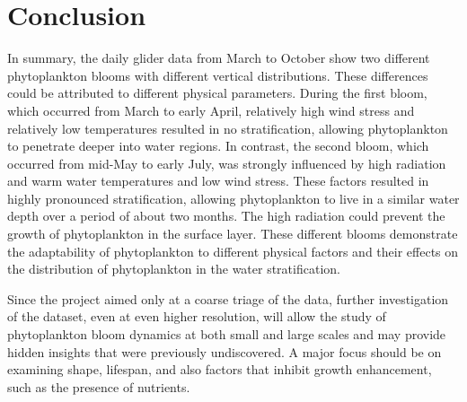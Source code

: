 \documentclass[../Main.tex]{subfiles}
\begin{document}
\section*{\crule[blue]{.3cm}{.3cm} Conclusion}
In summary, the daily glider data from March to October show two different phytoplankton blooms with different vertical distributions. These differences could be attributed to different physical parameters.
During the first bloom, which occurred from March to early April, relatively high wind stress and relatively low temperatures resulted in no stratification, allowing phytoplankton to penetrate deeper into water regions.
In contrast, the second bloom, which occurred from mid-May to early July, was strongly influenced by high radiation and warm water temperatures and low wind stress. These factors resulted in highly pronounced stratification, allowing phytoplankton to live in a similar water depth over a period of about two months. The high radiation could prevent the growth of phytoplankton in the surface layer.
These different blooms demonstrate the adaptability of phytoplankton to different physical factors and their effects on the distribution of phytoplankton in the water stratification.

Since the project aimed only at a coarse triage of the data, further investigation of the dataset, even at even higher resolution, will allow the study of phytoplankton bloom dynamics at both small and large scales and may provide hidden insights that were previously undiscovered.
A major focus should be on examining shape, lifespan, and also factors that inhibit growth enhancement, such as the presence of nutrients.
\end{document}
